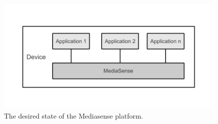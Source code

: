 \begin{figure}[h!]
	\centering
    	\includegraphics[scale=0.75]{part_4/result_and_analysis/mediasense_arch_new.pdf}
    	\centering
		\caption{The desired state of the Mediasense platform.} 
\end{figure}
